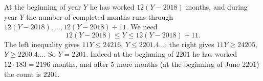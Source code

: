 At the beginning of year $Y$ he has worked $12(Y-2018)$ months, and during year $Y$ the number of completed months runs through $12(Y-2018),\dots,12(Y-2018)+11$. We need
\[
12(Y-2018)\le Y\le12(Y-2018)+11 .
\]
The left inequality gives $11Y\le24216$, $Y\le2201.4\ldots$; the right gives $11Y\ge24205$, $Y\ge2200.4\ldots$. So $Y=\boxed{2201}$. Indeed at the beginning of $2201$ he has worked $12\cdot183=2196$ months, and after $5$ more months (at the beginning of June $2201$) the count is $2201$.
